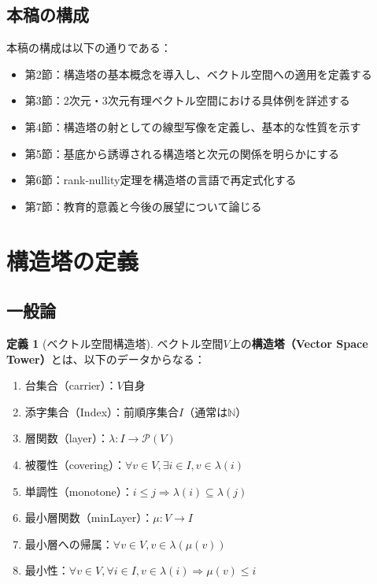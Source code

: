 \documentclass[a4paper,11pt]{ltjsarticle}
\theoremstyle{definition}
\newtheorem{definition}{定義}[section]
\begin{document}
\subsection{本稿の構成}

本稿の構成は以下の通りである：
\begin{itemize}
  \item 第2節：構造塔の基本概念を導入し、ベクトル空間への適用を定義する
  \item 第3節：2次元・3次元有理ベクトル空間における具体例を詳述する
  \item 第4節：構造塔の射としての線型写像を定義し、基本的な性質を示す
  \item 第5節：基底から誘導される構造塔と次元の関係を明らかにする
  \item 第6節：rank-nullity定理を構造塔の言語で再定式化する
  \item 第7節：教育的意義と今後の展望について論じる
\end{itemize}

\section{構造塔の定義}

\subsection{一般論}

\begin{definition}[ベクトル空間構造塔]
ベクトル空間$V$上の\textbf{構造塔（Vector Space Tower）}とは、以下のデータからなる：
\begin{enumerate}
  \item 台集合（carrier）：$V$自身
  \item 添字集合（Index）：前順序集合$I$（通常は$\mathbb{N}$）
  \item 層関数（layer）：$\lambda : I \to \mathcal{P}(V)$
  \item 被覆性（covering）：$\forall v \in V, \exists i \in I, v \in \lambda(i)$
  \item 単調性（monotone）：$i \leq j \Rightarrow \lambda(i) \subseteq \lambda(j)$
  \item 最小層関数（minLayer）：$\mu : V \to I$
  \item 最小層への帰属：$\forall v \in V, v \in \lambda(\mu(v))$
  \item 最小性：$\forall v \in V, \forall i \in I, v \in \lambda(i) \Rightarrow \mu(v) \leq i$
\end{enumerate}
\end{definition}
\end{document}
